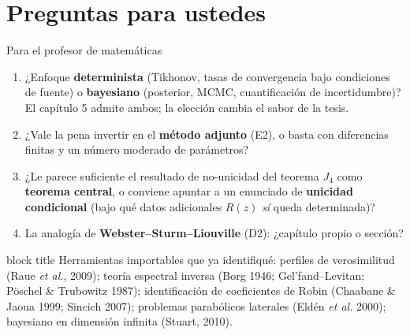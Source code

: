 \documentclass[aspectratio=169,10pt,t]{beamer}
\newcommand{\mensaje}[1]{%
  \vfill
  \begin{beamercolorbox}[wd=\linewidth,sep=0.4em,rounded=true]{block title}
  \footnotesize #1
  \end{beamercolorbox}}
\begin{document}
\section{Preguntas para ustedes}

\begin{frame}{Para el profesor de matemáticas}
\begin{enumerate}
  \item ¿Enfoque \textbf{determinista} (Tikhonov, tasas de convergencia bajo
    condiciones de fuente) o \textbf{bayesiano} (posterior, MCMC, cuantificación
    de incertidumbre)? El capítulo 5 admite ambos; la elección cambia el sabor
    de la tesis.
  \item ¿Vale la pena invertir en el \textbf{método adjunto} (E2), o basta con
    diferencias finitas y un número moderado de parámetros?
  \item ¿Le parece suficiente el resultado de no-unicidad del teorema $J_4$ como
    \textbf{teorema central}, o conviene apuntar a un enunciado de
    \textbf{unicidad condicional} (bajo qué datos adicionales $R(z)$ \emph{sí}
    queda determinada)?
  \item La analogía de \textbf{Webster–Sturm–Liouville} (D2): ¿capítulo propio o
    sección?
\end{enumerate}

\mensaje{Herramientas importables que ya identifiqué: perfiles de verosimilitud
(Raue \emph{et al.}, 2009); teoría espectral inversa (Borg 1946;
Gel'fand–Levitan; Pöschel \& Trubowitz 1987); identificación de coeficientes de
Robin (Chaabane \& Jaoua 1999; Sincich 2007); problemas parabólicos laterales
(Eldén \emph{et al.} 2000); bayesiano en dimensión infinita (Stuart, 2010).}
\end{frame}
\end{document}
